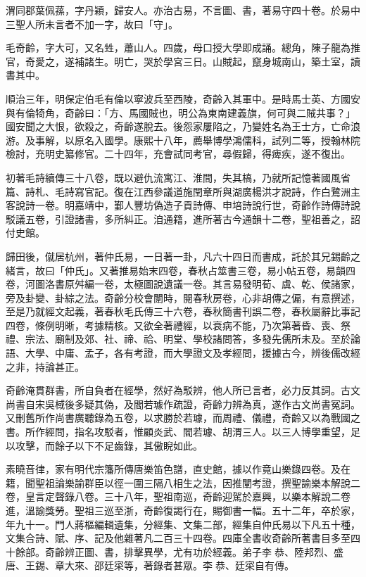 \begin{pinyinscope}
渭同郡葉佩蓀，字丹穎，歸安人。亦治古易，不言圖、書，著易守四十卷。於易中三聖人所未言者不加一字，故曰「守」。

毛奇齡，字大可，又名甡，蕭山人。四歲，母口授大學即成誦。總角，陳子龍為推官，奇愛之，遂補諸生。明亡，哭於學宮三日。山賊起，竄身城南山，築土室，讀書其中。

順治三年，明保定伯毛有倫以寧波兵至西陵，奇齡入其軍中。是時馬士英、方國安與有倫犄角，奇齡曰：「方、馬國賊也，明公為東南建義旗，何可與二賊共事？」國安聞之大恨，欲殺之，奇齡遂脫去。後怨家屢陷之，乃變姓名為王士方，亡命浪游。及事解，以原名入國學。康熙十八年，薦舉博學鴻儒科，試列二等，授翰林院檢討，充明史纂修官。二十四年，充會試同考官，尋假歸，得痺疾，遂不復出。

初著毛詩續傳三十八卷，既以避仇流寓江、淮間，失其槁，乃就所記憶著國風省篇、詩札、毛詩寫官記。復在江西參議道施閏章所與湖廣楊洪才說詩，作白鷺洲主客說詩一卷。明嘉靖中，鄞人豐坊偽造子貢詩傳、申培詩說行世，奇齡作詩傳詩說駁議五卷，引證諸書，多所糾正。洎通籍，進所著古今通韻十二卷，聖祖善之，詔付史館。

歸田後，僦居杭州，著仲氏易，一日著一卦，凡六十四日而書成，託於其兄錫齡之緒言，故曰「仲氏」。又著推易始末四卷，春秋占筮書三卷，易小帖五卷，易韻四卷，河圖洛書原舛編一卷，太極圖說遺議一卷。其言易發明荀、虞、乾、侯諸家，旁及卦變、卦綜之法。奇齡分校會闈時，閱春秋房卷，心非胡傳之偏，有意撰述，至是乃就經文起義，著春秋毛氏傳三十六卷，春秋簡書刊誤二卷，春秋屬辭比事記四卷，條例明晰，考據精核。又欲全著禮經，以衰病不能，乃次第著昏、喪、祭禮、宗法、廟制及郊、社、禘、祫、明堂、學校諸問答，多發先儒所未及。至於論語、大學、中庸、孟子，各有考證，而大學證文及孝經問，援據古今，辨後儒改經之非，持論甚正。

奇齡淹貫群書，所自負者在經學，然好為駁辨，他人所已言者，必力反其詞。古文尚書自宋吳棫後多疑其偽，及閻若璩作疏證，奇齡力辨為真，遂作古文尚書冤詞。又刪舊所作尚書廣聽錄為五卷，以求勝於若璩，而周禮、儀禮，奇齡又以為戰國之書。所作經問，指名攻駁者，惟顧炎武、閻若璩、胡渭三人。以三人博學重望，足以攻擊，而餘子以下不足齒錄，其傲睨如此。

素曉音律，家有明代宗籓所傳唐樂笛色譜，直史館，據以作竟山樂錄四卷。及在籍，聞聖祖論樂諭群臣以徑一圍三隔八相生之法，因推闡考證，撰聖諭樂本解說二卷，皇言定聲錄八卷。三十八年，聖祖南巡，奇齡迎駕於嘉興，以樂本解說二卷進，溫諭獎勞。聖祖三巡至浙，奇齡復謁行在，賜御書一幅。五十二年，卒於家，年九十一。門人蔣樞編輯遺集，分經集、文集二部，經集自仲氏易以下凡五十種，文集合詩、賦、序、記及他雜著凡二百三十四卷。四庫全書收奇齡所著書目多至四十餘部。奇齡辨正圖、書，排擊異學，尤有功於經義。弟子李恭、陸邦烈、盛唐、王錫、章大來、邵廷寀等，著錄者甚眾。李恭、廷寀自有傳。


\end{pinyinscope}
